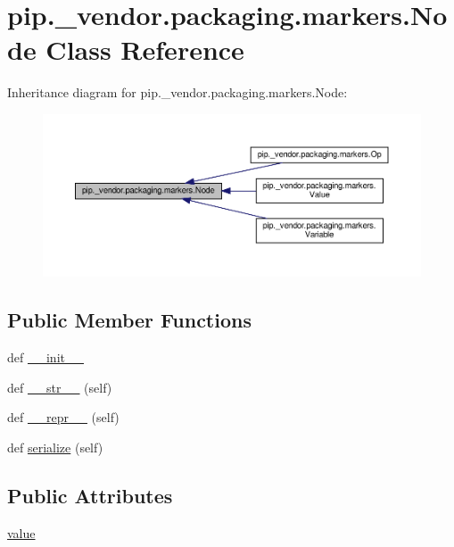 \hypertarget{classpip_1_1__vendor_1_1packaging_1_1markers_1_1Node}{}\section{pip.\+\_\+vendor.\+packaging.\+markers.\+Node Class Reference}
\label{classpip_1_1__vendor_1_1packaging_1_1markers_1_1Node}


Inheritance diagram for pip.\+\_\+vendor.\+packaging.\+markers.\+Node\+:
\nopagebreak
\begin{figure}[H]
\begin{center}
\leavevmode
\includegraphics[width=350pt]{classpip_1_1__vendor_1_1packaging_1_1markers_1_1Node__inherit__graph}
\end{center}
\end{figure}
\subsection*{Public Member Functions}
\begin{DoxyCompactItemize}
\item 
def \hyperlink{classpip_1_1__vendor_1_1packaging_1_1markers_1_1Node_a045c175e5dd0ddd31bd7052ab38a36a8}{\+\_\+\+\_\+init\+\_\+\+\_\+}
\item 
def \hyperlink{classpip_1_1__vendor_1_1packaging_1_1markers_1_1Node_a91b5d5dd83b58b6823fcce727606de96}{\+\_\+\+\_\+str\+\_\+\+\_\+} (self)
\item 
def \hyperlink{classpip_1_1__vendor_1_1packaging_1_1markers_1_1Node_a57dc083241d012967d20ac9941c67172}{\+\_\+\+\_\+repr\+\_\+\+\_\+} (self)
\item 
def \hyperlink{classpip_1_1__vendor_1_1packaging_1_1markers_1_1Node_a82d79f4852d43425fbdc8eecef7ec5cc}{serialize} (self)
\end{DoxyCompactItemize}
\subsection*{Public Attributes}
\begin{DoxyCompactItemize}
\item 
\hyperlink{classpip_1_1__vendor_1_1packaging_1_1markers_1_1Node_a8f21ea0c1f5ca970e14b10ccd3a754c6}{value}
\end{DoxyCompactItemize}


